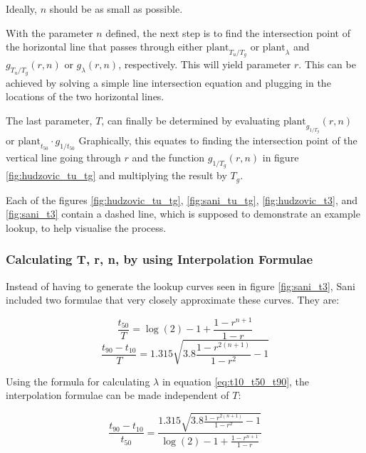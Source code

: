 Ideally, $n$ should be as small as possible.

With the parameter $n$ defined, the next step is to find the  intersection point
of the horizontal line that passes through either  $\textrm{plant}_{T_u/T_g}$ or
$\textrm{plant}_{\lambda}$   and   $g_{T_u/T_g}(r,n)$   or   $g_{\lambda}(r,n)$,
respectively.  This will yield parameter $r$. This can be achieved by solving  a
simple  line  intersection  equation  and plugging in the locations of  the  two
horizontal lines.

The   last   parameter,   $T$,   can  finally  be   determined   by   evaluating
$\textrm{plant}_{g_{1/T_g}}(r,    n)$    or    $\textrm{plant}_{t_{50}}    \cdot
g_{1/t_{50}}$ Graphically, this equates to finding the intersection point of the
vertical line going through $r$ and the function  $g_{1/T_g}(r,  n)$  in  figure
\ref{fig:hudzovic_tu_tg} and multiplying the result by $T_g$.

Each    of   the   figures    \ref{fig:hudzovic_tu_tg},    \ref{fig:sani_tu_tg},
\ref{fig:hudzovic_t3}, and \ref{fig:sani_t3}  contain  a  dashed  line, which is
supposed to demonstrate  an  example  lookup,  to  help  visualise  the process.


\subsubsection*{Calculating T, r, n, by using Interpolation Formulae}

Instead   of   having   to   generate  the  lookup   curves   seen   in   figure
\ref{fig:sani_t3},  Sani\cite{ref:sani} included two formulae that very  closely
approximate these curves. They are:

\begin{equation}
    \frac{t_{50}}{T} = \log(2)-1+\frac{1-r^{n+1}}{1-r}
    \label{eq:T_t50}
\end{equation}
\begin{equation}
    \frac{t_{90}-t_{10}}{T} = 1.315 \sqrt{3.8\frac{1-r^{2\left(n+1\right)}}{1-r^2} - 1}
\end{equation}

Using  the  formula for calculating $\lambda$ in equation  \ref{eq:t10_t50_t90},
the interpolation formulae can be made independent of $T$:

\begin{equation}
    \frac{t_{90}-t_{10}}{t_{50}} = \frac{1.315 \sqrt{3.8\frac{1-r^{2\left(n+1\right)}}{1-r^2} - 1}}{\log(2)-1+\frac{1-r^{n+1}}{1-r}}
    \label{eq:sani_interpolation}
\end{equation}

